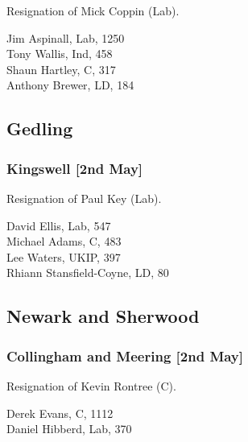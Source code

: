 \documentclass[a4paper,openany,10pt]{book}
\begin{document}

Resignation of Mick Coppin (Lab).



Jim Aspinall, Lab, 1250\\
Tony Wallis, Ind, 458\\
Shaun Hartley, C, 317\\
Anthony Brewer, LD, 184\\


\subsection*{Gedling}

\subsubsection*{Kingswell \hspace*{\fill}\nolinebreak[1]%
\enspace\hspace*{\fill}
[2nd May]}


Resignation of Paul Key (Lab).



David Ellis, Lab, 547\\
Michael Adams, C, 483\\
Lee Waters, UKIP, 397\\
{Rhiann Stansfield-Coyne}, LD, 80\\


\subsection*{Newark and Sherwood}

\subsubsection*{Collingham and Meering \hspace*{\fill}\nolinebreak[1]%
\enspace\hspace*{\fill}
[2nd May]}


Resignation of Kevin Rontree (C).



Derek Evans, C, 1112\\
Daniel Hibberd, Lab, 370\\
\end{document}
